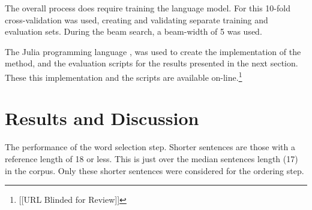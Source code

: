 \documentclass[11pt]{article}
\theoremstyle{plain}
\theoremstyle{definition}
\begin{document}
The overall process does require training the language model. For this 10-fold cross-validation was used, creating and validating separate training and evaluation sets. During the beam search, a beam-width of 5 was used.

The Julia programming language \parencite{Julia}, was used to create the implementation of the method, and the evaluation scripts for the results presented in the next section. These this implementation  and the scripts are available on-line.\footnote{[[URL Blinded for Review]]}

\section{Results and Discussion} \label{results}

\begin{table}		
	\caption{ The performance of the word selection step. Shorter sentences are those with a reference length of 18 or less. This is just over the median sentences length (17) in the corpus. Only these shorter sentences were considered for the ordering step.}
	\label{table:overall}
\end{table}


\begin{figure}
	\label{figure:exactlenscore}
\end{figure}
\end{document}
